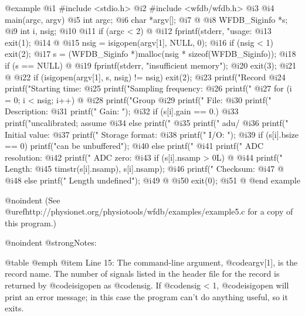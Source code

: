 {{{{{{{{{@example
 @i{1}  #include <stdio.h>
 @i{2}  #include <wfdb/wfdb.h>
 @i{3}
 @i{4}  main(argc, argv)
 @i{5}  int argc;
 @i{6}  char *argv[];
 @i{7}  @{
 @i{8}      WFDB_Siginfo *s;
 @i{9}      int i, nsig;
@i{10}
@i{11}      if (argc < 2) @{
@i{12}          fprintf(stderr, "usage: %
@i{13}          exit(1);
@i{14}      @}
@i{15}      nsig = isigopen(argv[1], NULL, 0);
@i{16}      if (nsig < 1) exit(2);
@i{17}      s = (WFDB_Siginfo *)malloc(nsig * sizeof(WFDB_Siginfo));
@i{18}      if (s == NULL) @{
@i{19}          fprintf(stderr, "insufficient memory\n");
@i{20}	        exit(3);
@i{21}      @}
@i{22}      if (isigopen(argv[1], s, nsig) != nsig) exit(2);
@i{23}      printf("Record %
@i{24}      printf("Starting time: %
@i{25}      printf("Sampling frequency: %
@i{26}      printf("%
@i{27}      for (i = 0; i < nsig; i++) @{
@i{28}          printf("Group %
@i{29}          printf(" File: %
@i{30}          printf(" Description: %
@i{31}          printf(" Gain: ");
@i{32}          if (s[i].gain == 0.)
@i{33}              printf("uncalibrated; assume %
@i{34}          else printf("%
@i{35}          printf(" adu/%
@i{36}          printf(" Initial value: %
@i{37}          printf(" Storage format: %
@i{38}          printf(" I/O: ");
@i{39}          if (s[i].bsize == 0) printf("can be unbuffered\n");
@i{40}          else printf("%
@i{41}          printf(" ADC resolution: %
@i{42}          printf(" ADC zero: %
@i{43}          if (s[i].nsamp > 0L) @{
@i{44}              printf(" Length: %
@i{45}                     timstr(s[i].nsamp), s[i].nsamp);
@i{46}              printf(" Checksum: %
@i{47}          @}
@i{48}          else printf(" Length undefined\n");
@i{49}      @}
@i{50}      exit(0);
@i{51}  @}
@end example

@noindent
(See @uref{http://physionet.org/physiotools/wfdb/examples/example5.c}
for a copy of this program.)

@noindent
@strong{Notes:}

@table @emph
@item Line 15:
The command-line argument, @code{argv[1]}, is the record name.  The
number of signals listed in the header file for the record is returned by
@code{isigopen} as @code{nsig}.  If @code{nsig} < 1, @code{isigopen} will
print an error message; in this case the program can't do anything useful,
so it exits.

}}}}}}}}}
